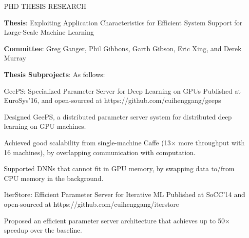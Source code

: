 \documentclass{resume} %
\begin{document}
\begin{rSection}{PHD THESIS RESEARCH}

\hspace{-1em} \textbf{Thesis}: Exploiting Application Characteristics for Efficient System Support for Large-Scale Machine Learning
\begin{list}{\enskip\textbullet}{\leftmargin=2em}
\item \textbf{Committee}: Greg Ganger, Phil Gibbons, Garth Gibson, Eric Xing, and Derek Murray
\item \textbf{Thesis Subprojects}: As follows:
\end{list}

\begin{rSubsection}{\hspace{-1em} GeePS: Specialized Parameter Server for Deep Learning on GPUs}{}
{Published at EuroSys'16, and open-sourced at https://github.com/cuihenggang/geeps}{}
\item Designed GeePS, a distributed parameter server system for distributed deep learning on GPU machines.
\item Achieved good scalability from single-machine Caffe (13$\times$ more throughput with 16 machines), by overlapping communication with computation.
\item Supported DNNs that cannot fit in GPU memory, by swapping data to/from CPU memory in the background.
\end{rSubsection}

\begin{rSubsection}{\hspace{-1em} IterStore: Efficient Parameter Server for Iterative ML}{}
{Published at SoCC'14 and open-sourced at https://github.com/cuihenggang/iterstore}{}
\item Proposed an efficient parameter server architecture that achieves up to 50$\times$ speedup over the baseline.
\end{rSubsection}


\end{rSection}
\end{document}
